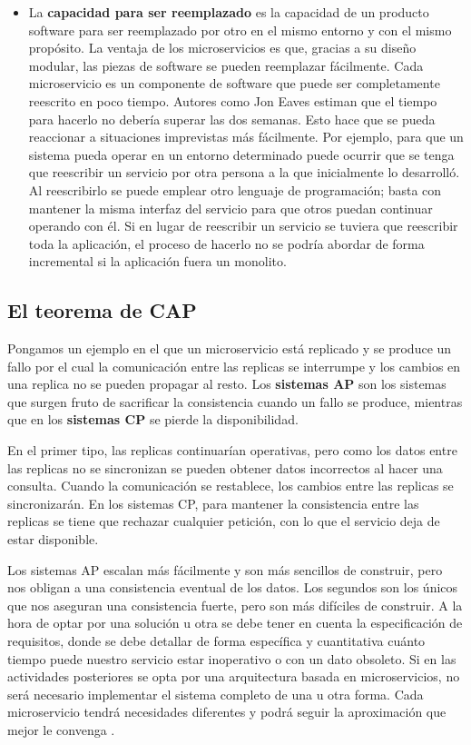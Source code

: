 \documentclass[11pt,spanish,listoffigures]{tfgetsinf}
\begin{document}
\begin{itemize}
\item La \textbf{capacidad para ser reemplazado} es la capacidad de un producto software para ser reemplazado por otro en el mismo entorno y con el mismo propósito. La ventaja de los microservicios es que, gracias a su diseño modular, las piezas de software se pueden reemplazar fácilmente. Cada microservicio es un componente de software que puede ser completamente reescrito en poco tiempo. Autores como Jon Eaves \cite{Eaves2014} estiman que el tiempo para hacerlo no debería superar las dos semanas. Esto hace que se pueda reaccionar a situaciones imprevistas más fácilmente. Por ejemplo, para que un sistema pueda operar en un entorno determinado puede ocurrir que se tenga que reescribir un servicio por otra persona a la que inicialmente lo desarrolló. Al reescribirlo se puede emplear otro lenguaje de programación; basta con mantener la misma interfaz del servicio para que otros puedan continuar operando con él. Si en lugar de reescribir un servicio se tuviera que reescribir toda la aplicación, el proceso de hacerlo no se podría abordar de forma incremental si la aplicación fuera un monolito.

\end{itemize}

\subsection{El teorema de CAP}

Pongamos un ejemplo en el que un microservicio está replicado y se produce un fallo por el cual la comunicación entre las replicas se interrumpe y los cambios en una replica no se pueden propagar al resto. Los \textbf{sistemas AP} son los sistemas que surgen fruto de sacrificar la consistencia cuando un fallo se produce, mientras que en los \textbf{sistemas CP} se pierde la disponibilidad. 

En el primer tipo, las replicas continuarían operativas, pero como los datos entre las replicas no se sincronizan se pueden obtener datos incorrectos al hacer una consulta. Cuando la comunicación se restablece, los cambios entre las replicas se sincronizarán. En los sistemas CP, para mantener la consistencia entre las replicas se tiene que rechazar cualquier petición, con lo que el servicio deja de estar disponible.

Los sistemas AP escalan más fácilmente y son más sencillos de construir, pero nos obligan a una consistencia eventual de los datos. Los segundos son los únicos que nos aseguran una consistencia fuerte, pero son más difíciles de construir. A la hora de optar por una solución u otra se debe tener en cuenta la especificación de requisitos, donde se debe detallar de forma específica y cuantitativa cuánto tiempo puede nuestro servicio estar inoperativo o con un dato obsoleto. Si en las actividades posteriores se opta por una arquitectura basada en microservicios, no será necesario implementar el sistema completo de una u otra forma. Cada microservicio tendrá necesidades diferentes y podrá seguir la aproximación que mejor le convenga \cite{Newman2015a}.
\end{document}
